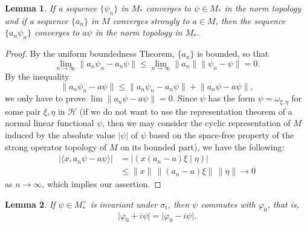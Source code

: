 \documentclass[12pt,b5paper,twoside]{article}
\theoremstyle{takesaki}
\newtheorem{lemma}{Lemma}[section]
\numberwithin{equation}{section}
\begin{document}
\begin{lemma}
\label{lem:15.10}
If a sequence $\{\psi_n\}$ in $M_*$ converges to $\psi\in M_*$ in the
norm topology and if a sequence $\{a_n\}$ in $M$ converges strongly to
$a\in M$, then the sequence $\{a_n\psi_n\}$ converges to $a\psi$ in the
norm topology in $M_*$.
\end{lemma}

\begin{proof}
By the uniform boundedness Theorem, $\{a_n\}$ is bounded, so that
\[
  \lim_{n\to\infty}\lVert a_n\psi_n-a_n\psi\rVert
  \leq\lim_{n\to\infty}\lVert a_n\rVert
        \lVert\psi_n-\psi\rVert=0.
\]
By the inequality
\[
  \lVert a_n\psi_n-a\psi\rVert
  \leq\lVert a_n\psi_n-a_n\psi\rVert
      +\lVert a_n\psi-a\psi\rVert,
\]
we only have to prove
$\lim\lVert a_n\psi-a\psi\rVert=0$.  Since $\psi$ has the form
$\psi=\omega_{\xi,\eta}$ for some pair $\xi,\eta$ in $\mathcal H$
(if we do not want to use the representation theorem of a normal linear
functional $\psi$, then we may consider the cyclic representation of
$M$ induced by the absolute value $\lvert\psi\rvert$ of $\psi$ based on
the space-free property of the strong operator topology of $M$ on its
bounded part), we have the following:
\begin{align*}
  \bigl\lvert\langle x,a_n\psi-a\psi\rangle\bigr\rvert
    &=\bigl\lvert(x(a_n-a)\xi\mid\eta)\bigr\rvert\\
    &\leq\lVert x\rVert\,\lVert(a_n-a)\xi\rVert\,\lVert\eta\rVert
      \longrightarrow0
\end{align*}
as $n\to\infty$, which implies our assertion.
\end{proof}

\begin{lemma}
\label{lem:15.11}
If $\psi\in M_*^+$ is invariant under $\sigma_t$, then $\psi$ commutes
with $\varphi_0$, that is,
\[
  \lvert\varphi_0+i\psi\rvert=\lvert\varphi_0-i\psi\rvert.
\]
\end{lemma}
\end{document}
